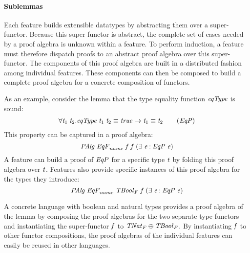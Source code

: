
\paragraph{Sublemmas} Each feature builds extensible datatypes by
abstracting them over a super-functor. Because this
super-functor is abstract, the complete set of cases needed by a proof
algebra is unknown within a feature. To perform induction, a feature
must therefore dispatch proofs to an abstract proof algebra over this
super-functor. The components of this proof algebra are built in a
distributed fashion among individual features. These components can
then be composed to build a complete proof algebra for a
concrete composition of functors.


As an example, consider the lemma that the type equality function
\ensuremath{\Varid{eqType}} is sound:
\begin{gather}
\ensuremath{\forall \Varid{t}_1\hsforall \;\Varid{t}_2\hsdot{\circ }{.}\Varid{eqType}\;\Varid{t}_1\;\Varid{t}_2\equiv \Varid{true}\to \Varid{t}_1\equiv \Varid{t}_2}
\tag{\ensuremath{\Conid{EqP}}}
\end{gather}
This property can be captured in a proof algebra:
\[ \mathit{PAlg}\;\mathit{EqF}_{name}\;\mathit{f}\;\mathit{f}\;(\exists\;\mathit{e}\mathbin{:}\mathit{EqP}\;\mathit{e}) \]
A feature can build a proof of \ensuremath{\Conid{EqP}} for a specific type \ensuremath{\Varid{t}} by folding
this proof algebra over \ensuremath{\Varid{t}}. Features also provide specific instances of
this proof algebra for the types they introduce:
\[  \mathit{PAlg}\;\mathit{EqF}_{name}\;\mathit{TBool}_F\;\mathit{f}\;(\exists\;\mathit{e}\mathbin{:}\mathit{EqP}\;\mathit{e}) \]

A concrete language with boolean and natural types
provides a proof algebra of the lemma by composing
the proof algebras for the two separate type functors
and instantiating the super-functor \ensuremath{\Varid{f}} to \ensuremath{\Varid{TNat}_F\oplus\Varid{TBool}_F}.
By instantiating \ensuremath{\Varid{f}} to other functor compositions, the proof algebras
of the individual features can easily be reused in other languages.

